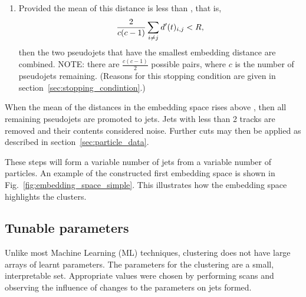 \begin{enumerate}
        \item\label{step:stoppingcondition}

            Provided the mean of this distance is less than \stoppingdeltar{}, that is,
            \begin{equation}
                \frac{2}{c(c-1)}\sum_{i\ne j} d'(t)_{i, j} < R{},
            \end{equation}
            then the two pseudojets that have the smallest embedding distance are combined.
            NOTE: there are $\frac{c(c-1)}{2}$ possible pairs, 
            where \(c\) is the number of pseudojets remaining.
            (Reasons for this stopping condition are given in section~\ref{sec:stopping_condintion}.)
        
     \end{enumerate}
    When the mean of the distances in the embedding space rises above \stoppingdeltar{},
    then all remaining pseudojets are promoted to jets.
    Jets with less than 2 tracks are removed and their contents considered noise.
    Further cuts may then be applied as described in section~\ref{sec:particle_data}.

    These steps will form a variable number of jets from a variable number of particles.
    An example of the constructed first embedding space is shown in Fig.~\ref{fig:embedding_space_simple}.
    This illustrates how the embedding space highlights the clusters.

\subsection{Tunable parameters}\label{sec:spectralmethodparam}
Unlike most Machine Learning (ML) techniques, \spectral{} clustering does not have large arrays of learnt parameters.
The parameters for the clustering are a small, interpretable  set.
Appropriate values were chosen by performing scans and observing the influence of changes to the parameters on jets formed.

